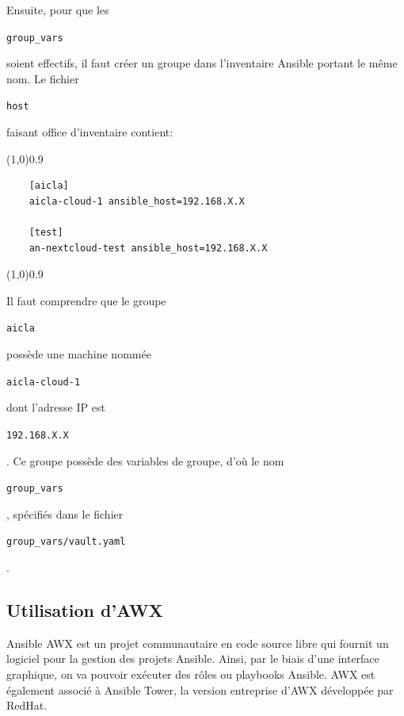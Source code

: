 \documentclass[12pt, a4paper, twoside]{article}
\begin{document}
Ensuite, pour que les \begin{code}\texttt{group\_vars}\end{code} soient effectifs, il faut créer un groupe dans l'inventaire \gls{Ansible} portant le même nom. 
Le fichier \begin{code}\texttt{host}\end{code} faisant office d'inventaire contient:
\vspace{-1ex}
\begin{code}
\vspace{-1ex}
\begin{center} 
    \line(1,0){0.9\textwidth} 
\end{center}
\vspace{-1ex}
\begin{verbatim}
    [aicla]
    aicla-cloud-1 ansible_host=192.168.X.X
    
    [test]
    an-nextcloud-test ansible_host=192.168.X.X
\end{verbatim}
\vspace{-1ex}
\begin{center} 
    \line(1,0){0.9\textwidth} 
\end{center}
\vspace{-1ex}
\end{code}


Il faut comprendre que le groupe \begin{code}\texttt{aicla}\end{code} possède une machine nommée \begin{code}\texttt{aicla-cloud-1}\end{code} dont l'adresse \gls{IP} est \begin{code}\texttt{192.168.X.X}\end{code}. 
Ce groupe possède des variables de groupe, d'où le nom \begin{code}\texttt{group\_vars}\end{code}, spécifiés dans le fichier \begin{code}\texttt{group\_vars/vault.yaml}\end{code}.

\subsection{Utilisation d'AWX}
Ansible AWX est un projet communautaire en code source libre qui fournit un logiciel pour la gestion des projets Ansible.
Ainsi, par le biais d'une interface graphique, on va pouvoir exécuter des rôles ou playbooks Ansible.
AWX est également associé à Ansible Tower, la version entreprise d'AWX développée par RedHat.
\end{document}
